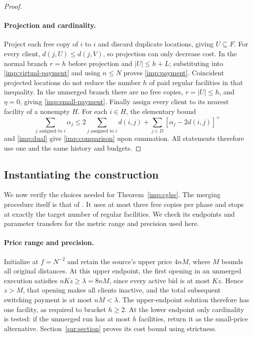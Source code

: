 \begin{proof}
\paragraph{Projection and cardinality.}
Project each free copy of $i$ to $i$ and discard duplicate locations,
giving $U\subseteq F$.  For every client,
$d(j,U)\le d(j,V)$, so projection can only decrease cost.
In the normal branch $r=h$ before projection and $|U|\le h+L$;
substituting into \eqref{imp:virtual-payment} and using $n\le N$
proves \eqref{imp:payment}.  Coincident projected locations do not
reduce the number $h$ of paid regular facilities in that inequality.
In the unmerged branch there are no free copies, $r=|U|\le h$,
and $\eta=0$, giving \eqref{imp:small-payment}.
Finally assign every client to its nearest facility of a nonempty
$H$.  For each $i\in H$, the elementary bound
\[
 \sum_{j\text{ assigned to }i}\alpha_j
 \le2\sum_{j\text{ assigned to }i}d(i,j)
       +\sum_{j\in D}[\alpha_j-2d(i,j)]^+
\]
and \eqref{imp:dual} give \eqref{imp:comparison} upon summation.
All statements therefore use one and the same history and budgets.
\end{proof}

\subsection{Instantiating the construction}
\label{imp:instantiation}

We now verify the choices needed for Theorem~\ref{imp:cglss}.
The merging procedure itself is that of \cite[Section~3.5]{CGLSS2026}.
It uses at most three free copies per phase and stops at exactly the
target number of regular facilities. We check its endpoints and
parameter transfers for the metric range and precision used here.

\paragraph{Price range and precision.}
Initialize at $f=N^{-2}$ and retain the source's
upper price $4nM$, where $M$ bounds all original distances.
At this upper endpoint, the first opening in an unmerged execution
satisfies $nKz\ge\lambda=8nM$, since every active bid is at most
$Kz$. Hence $z>M$, that opening makes all clients inactive, and
the total subsequent switching payment is at most $nM<\lambda$.
The upper-endpoint solution therefore has one facility, as required
to bracket $h\ge2$. At the lower endpoint only cardinality is tested:
if the unmerged run has at most $h$ facilities, return it as the
small-price alternative. Section~\ref{sur:section} proves its cost
bound using strictness.

